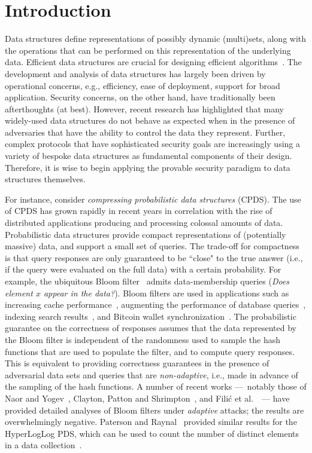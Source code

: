 \chapter{Introduction}


Data structures define representations of possibly dynamic (multi)sets, along with the operations that can be performed on this representation of the underlying data. Efficient data structures are crucial for designing efficient algorithms~\cite{clrs}. The development and analysis of data structures has largely been driven by operational concerns, e.g., efficiency, ease of deployment, support for broad application. Security concerns, on the other hand, have traditionally been afterthoughts (at best). However, recent research has highlighted that many widely-used data structures do not behave as expected when in the presence of adversaries that have the ability to control the data they represent. Further, complex protocols that have sophisticated security goals are increasingly using a variety of bespoke data structures as fundamental components of their design. Therefore, it is wise to begin applying the provable security paradigm to data structures themselves. 

For instance, consider \emph{compressing probabilistic data structures} (CPDS). The use of CPDS has grown rapidly in recent years in correlation with the rise of distributed applications producing and processing colossal amounts of data. Probabilistic data structures provide compact representations of (potentially massive) data, and support a small set of queries.  The trade-off for compactness is that query responses are only guaranteed to be ``close" to the true answer (i.e., if the query were evaluated on the full data) with a certain probability. For example, the ubiquitous Bloom filter~\cite{bloom1970space} admits data-membership queries (\emph{Does element $x$ appear in the data?}).  Bloom filters are used in applications such as increasing cache performance~\cite{maggs2015}, augmenting the performance of database queries~\cite{dean2006}, indexing search results~\cite{goodwin2017bitfunnel}, and Bitcoin wallet synchronization~\cite{bip-0037}.
The probabilistic guarantee on the correctness of responses assumes that the data represented by the Bloom filter is independent of the randomness used to sample the hash functions that are used to populate the filter, and to compute query responses.  This is equivalent to providing correctness guarantees in the presence of adversarial data sets and queries that are \emph{non-adaptive}, i.e., made in advance of the sampling of the hash functions.  A number of recent works ---~notably those of Naor and Yogev~\cite{naor2015bloom}, Clayton, Patton and Shrimpton~\cite{clayton2019}, and Fili\'{c} et al.~\cite{_CCS:FPUV22}~--- have provided detailed analyses of Bloom filters under \emph{adaptive} attacks; the results are overwhelmingly negative. Paterson and Raynal~\cite{paterson2021} provided similar results for the HyperLogLog PDS, which can be used to count the number of distinct elements in a data collection~\cite{flajolet2007hyperloglog}.



